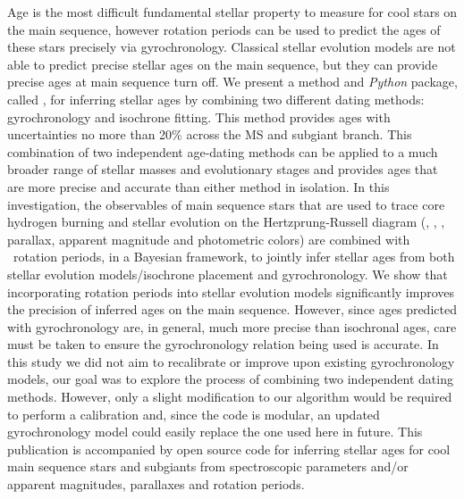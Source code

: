 Age is the most difficult fundamental stellar property to measure for cool
stars on the main sequence, however rotation periods can be used to predict
the ages of these stars precisely via gyrochronology.
Classical stellar evolution models are not able to predict precise stellar
ages on the main sequence, but they can provide precise ages at main sequence
turn off.
We present a method and {\it Python} package, called \sd, for inferring
stellar ages by combining two different dating methods: gyrochronology and
isochrone fitting.
This method provides ages with uncertainties no more than 20\% across the MS
and subgiant branch.
This combination of two independent age-dating methods can be applied to a
much broader range of stellar masses and evolutionary stages and provides ages
that are more precise and accurate than either method in isolation.
In this investigation, the observables of main sequence stars that are used to
trace core hydrogen burning and stellar evolution on the Hertzprung-Russell
diagram (\teff, \feh, \logg, parallax, apparent magnitude and photometric
colors) are combined with \kepler\ rotation periods, in a Bayesian framework,
to jointly infer stellar ages from both stellar evolution models/isochrone
placement and gyrochronology.
We show that incorporating rotation periods into stellar evolution models
significantly improves the precision of inferred ages on the main sequence.
However, since ages predicted with gyrochronology are, in general, much more
precise than isochronal ages, care must be taken to ensure the gyrochronology
relation being used is accurate.
In this study we did not aim to recalibrate or improve upon existing
gyrochronology models, our goal was to explore the process of combining two
independent dating methods.
However, only a slight modification to our algorithm would be required to
perform a calibration and, since the code is modular, an updated
gyrochronology model could easily replace the one used here in future.
This publication is accompanied by open source code for inferring stellar ages
for cool main sequence stars and subgiants from spectroscopic parameters
and/or apparent magnitudes, parallaxes and rotation periods.
